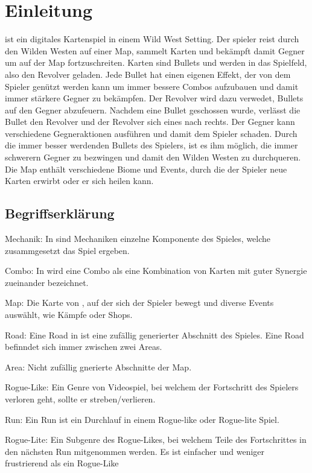
\section{Einleitung}\label{sec:einleitung}

\renewcommand{\kapitelautor}{Autor: Philip Jankovic}


\FF ist ein digitales Kartenspiel in einem Wild West Setting. Der spieler reist durch den Wilden Westen auf einer Map,
sammelt Karten und bekämpft damit Gegner um auf der Map fortzuschreiten. Karten sind Bullets und werden in das Spielfeld, also den Revolver geladen.
Jede Bullet hat einen eigenen Effekt, der von dem Spieler genützt werden kann um immer bessere Combos aufzubauen und damit immer stärkere Gegner zu bekämpfen.
Der Revolver wird dazu verwedet, Bullets auf den Gegner abzufeuern. Nachdem eine Bullet geschossen wurde, verlässt die
Bullet den Revolver und der Revolver sich eines nach rechts. Der Gegner kann verschiedene Gegneraktionen ausführen und damit dem Spieler schaden.
Durch die  immer besser werdenden Bullets des Spielers, ist es ihm möglich, die immer schwerern Gegner zu bezwingen und damit den Wilden Westen zu durchqueren.
Die Map enthält verschiedene Biome und Events, durch die der Spieler neue Karten erwirbt oder er sich heilen kann.



\subsection{Begriffserklärung}\label{begriffserklärung}
Mechanik: In \FF sind Mechaniken einzelne Komponente des Spieles, welche zusammgesetzt das Spiel ergeben.

Combo: In \FF wird eine Combo als eine Kombination von Karten mit guter Synergie zueinander bezeichnet.


Map: Die Karte von \FF, auf der sich der Spieler bewegt und diverse Events auswählt, wie \zB Kämpfe oder Shops.

Road: Eine Road in \FF ist eine zufällig generierter Abschnitt des Spieles. Eine Road befinndet sich immer zwischen zwei Areas.

Area: Nicht zufällig gnerierte Abschnitte der \FF Map.

Rogue-Like: Ein Genre von Videospiel, bei welchem der Fortschritt des Spielers verloren geht, sollte er streben/verlieren.

Run: Ein Run ist ein Durchlauf in einem Rogue-like oder Rogue-lite Spiel. 

Rogue-Lite: Ein Subgenre des Rogue-Likes, bei welchem Teile des Fortschrittes in den nächsten Run mitgenommen werden.
Es ist einfacher und weniger frustrierend als ein Rogue-Like

%

\renewcommand{\kapitelautor}{}
